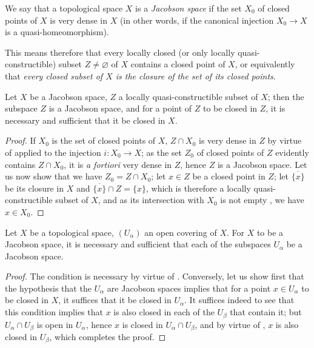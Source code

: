 
\begin{definition}[10.3.1]
\label{IV.10.3.1}
We say that a topological space $X$ is a \emph{Jacobson space} if the set $X_0$ of closed points of $X$ is very dense in $X$ (in other words, if the canonical injection $X_0\to X$ is a quasi-homeomorphism).
\end{definition}

This means therefore  that every locally closed (or only locally quasi-constructible) subset $Z\neq\varnothing$ of $X$ contains a closed point of $X$, or equivalently that \emph{every closed subset of $X$ is the closure of the set of its closed points}.

\begin{proposition}[10.3.2]
\label{IV.10.3.2}
Let $X$ be a Jacobson space, $Z$ a locally quasi-constructible subset of $X$; then the subspace $Z$ is a Jacobson space, and for a point of $Z$ to be closed in $Z$, it is necessary and sufficient that it be closed in $X$.
\end{proposition}

\begin{proof}
If $X_0$ is the set of closed points of $X$, $Z\cap X_0$ is very dense in $Z$ by virtue of  applied to the injection $i:X_0\to X$; as the set $Z_0$ of closed points of $Z$ evidently contains $Z\cap X_0$, it is \emph{a fortiori} very dense in $Z$, hence $Z$ is a Jacobson space.
Let us now show that we have $Z_0=Z\cap X_0$; let $x\in Z$ be a closed point in $Z$; let $\overline{\{x\}}$ be its closure in $X$ and $\overline{\{x\}}\cap Z=\{x\}$, which is therefore a locally quasi-constructible subset of $X$, and as its intersection with $X_0$ is not empty , we have $x\in X_0$.
\end{proof}

\begin{proposition}[10.3.3]
\label{IV.10.3.3}
Let $X$ be a topological space, $(U_\alpha)$ an open covering of $X$.
For $X$ to be a Jacobson space, it is necessary and sufficient that each of the subspaces $U_\alpha$ be a Jacobson space.
\end{proposition}

\begin{proof}
The condition is necessary by virtue of .
Conversely, let us show first that the hypothesis that the $U_\alpha$ are Jacobson spaces implies that for a point $x\in U_\alpha$ to be closed in $X$, it suffices that it be closed in $U_\alpha$.
It suffices indeed to see that this condition implies that $x$ is also closed in each of the $U_\beta$ that contain it; but $U_\alpha\cap U_\beta$ is open in $U_\alpha$, hence $x$ is closed in $U_\alpha\cap U_\beta$, and by virtue of , $x$ is also closed in $U_\beta$, which completes the proof.
\end{proof}


